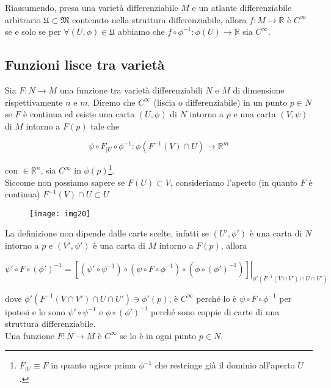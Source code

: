 Riassumendo, presa una varietà differenziabile $ M $ e un atlante differenziabile arbitrario $ \mathfrak{U} \subset \mathfrak{M} $ contenuto nella struttura differenziabile, allora $ f : M \to \mathbb{R} $ è $ C^{\infty} $ se e solo se per $ \forall (U,\phi) \in \mathfrak{U} $ abbiamo che $ f \circ \phi^{-1} : \phi(U) \to \mathbb{R} $ sia $ C^{\infty} $.

\subsection{Funzioni lisce tra varietà}

Sia $ F : N \to M $ una funzione tra varietà differenziabili $ N $ e $ M $ di dimensione rispettivamente $ n $ e $ m $. Diremo che $ C^{\infty} $ (liscia o differenziabile) in un punto $ p \in N $ se $ F $ è continua ed esiste una carta $ (U,\phi) $ di $ N $ intorno a $ p $ e una carta $ (V,\psi) $ di $ M $ intorno a $ F(p) $ tale che

\begin{equation}
	\psi \circ F_{|U} \circ \phi^{-1} : \phi(F^{-1}(V) \cap U) \to \mathbb{R}^{m}
\end{equation}

con $ \in \mathbb{R}^{n} $, sia $ C^{\infty} $ in $ \phi(p) $\footnote{%
	$ F_{|U} \equiv F $ in quanto agisce prima $ \phi^{-1} $ che restringe già il dominio all'aperto $ U $.%
}.\\
Siccome non possiamo sapere se $ F(U) \subset V $, consideriamo l'aperto (in quanto $ F $ è continua) $ F^{-1}(V) \cap U \subset U $

\begin{figure}[H]
	\centering
	\texttt{[image: img20]}
\end{figure}

La definizione non dipende dalle carte scelte, infatti se $ (U',\phi') $ è una carta di $ N $ intorno a $ p $ e $ (V',\psi') $ è una carta di $ M $ intorno a $ F(p) $, allora

\begin{equation}
	\psi' \circ F \circ (\phi')^{-1} = \left. [(\psi' \circ \psi^{-1}) \circ (\psi \circ F \circ \phi^{-1}) \circ (\phi \circ (\phi')^{-1})] \right|_{\phi'(F^{-1}(V \cap V') \cap U \cap U')}
\end{equation}

dove $ \phi'(F^{-1}(V \cap V') \cap U \cap U') \ni \phi'(p) $, è $ C^{\infty} $ perché lo è $ \psi \circ F \circ \phi^{-1} $ per ipotesi e lo sono $ \psi' \circ \psi^{-1} $ e $ \phi \circ (\phi')^{-1} $ perché sono coppie di carte di una struttura differenziabile.\\
Una funzione $ F : N \to M $ è $ C^{\infty} $ se lo è in ogni punto $ p \in N $.

